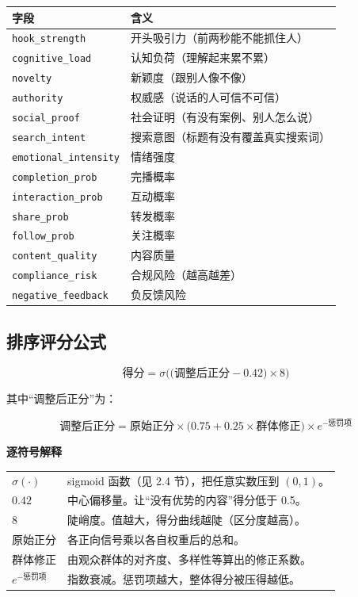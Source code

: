 \documentclass[UTF8,a4paper,11pt]{ctexart}
\newenvironment{explainbox}[1]
{\begin{center}\begin{minipage}{0.94\textwidth}\colorbox{boxbg}{\parbox{0.92\textwidth}{\textbf{#1}\par\vspace{2pt}}}}
{\end{minipage}\end{center}}
\newcommand{\sym}[1]{\texttt{#1}}
\begin{document}
\begin{center}
\begin{tabular}{p{4.4cm}p{9.4cm}}
\toprule
\textbf{字段} & \textbf{含义} \\
\midrule
\sym{hook\_strength} & 开头吸引力（前两秒能不能抓住人） \\
\sym{cognitive\_load} & 认知负荷（理解起来累不累） \\
\sym{novelty} & 新颖度（跟别人像不像） \\
\sym{authority} & 权威感（说话的人可信不可信） \\
\sym{social\_proof} & 社会证明（有没有案例、别人怎么说） \\
\sym{search\_intent} & 搜索意图（标题有没有覆盖真实搜索词） \\
\sym{emotional\_intensity} & 情绪强度 \\
\sym{completion\_prob} & 完播概率 \\
\sym{interaction\_prob} & 互动概率 \\
\sym{share\_prob} & 转发概率 \\
\sym{follow\_prob} & 关注概率 \\
\sym{content\_quality} & 内容质量 \\
\sym{compliance\_risk} & 合规风险（越高越差） \\
\sym{negative\_feedback} & 负反馈风险 \\
\bottomrule
\end{tabular}
\end{center}

\subsection{排序评分公式}

\begin{equation}
\text{得分} = \sigma\Big( \big(\text{调整后正分} - 0.42\big) \times 8 \Big)
\label{p1:eq:platform-score}
\end{equation}

其中“调整后正分”为：

\begin{equation}
\text{调整后正分} = \text{原始正分} \times \Big(0.75 + 0.25 \times \text{群体修正}\Big) \times e^{-\text{惩罚项}}
\label{p1:eq:adjusted}
\end{equation}

\begin{explainbox}{逐符号解释}
\begin{longtable}{@{}p{3.6cm}p{10.2cm}@{}}
$\sigma(\cdot)$ & sigmoid 函数（见 2.4 节），把任意实数压到 $(0,1)$。 \\
$0.42$ & 中心偏移量。让“没有优势的内容”得分低于 0.5。 \\
$8$ & 陡峭度。值越大，得分曲线越陡（区分度越高）。 \\
原始正分 & 各正向信号乘以各自权重后的总和。 \\
群体修正 & 由观众群体的对齐度、多样性等算出的修正系数。 \\
$e^{-\text{惩罚项}}$ & 指数衰减。惩罚项越大，整体得分被压得越低。 \\
\end{longtable}
\end{explainbox}
\end{document}
